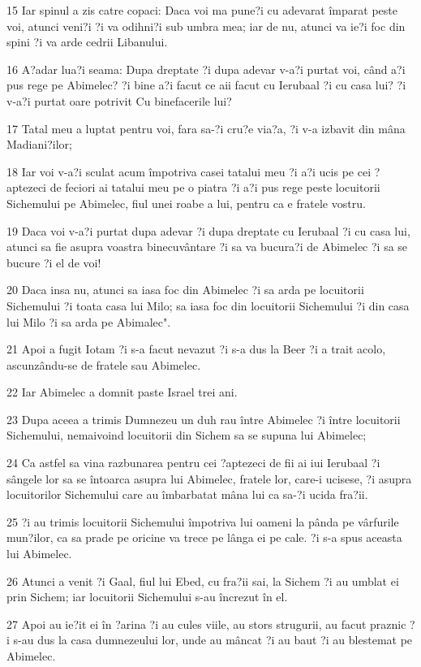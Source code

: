 \par 15 Iar spinul a zis catre copaci: Daca voi ma pune?i cu adevarat împarat peste voi, atunci veni?i ?i va odihni?i sub umbra mea; iar de nu, atunci va ie?i foc din spini ?i va arde cedrii Libanului.
\par 16 A?adar lua?i seama: Dupa dreptate ?i dupa adevar v-a?i purtat voi, când a?i pus rege pe Abimelec? ?i bine a?i facut ce aii facut cu Ierubaal ?i cu casa lui? ?i v-a?i purtat oare potrivit Cu binefacerile lui?
\par 17 Tatal meu a luptat pentru voi, fara sa-?i cru?e via?a, ?i v-a izbavit din mâna Madiani?ilor;
\par 18 Iar voi v-a?i sculat acum împotriva casei tatalui meu ?i a?i ucis pe cei ?aptezeci de feciori ai tatalui meu pe o piatra ?i a?i pus rege peste locuitorii Sichemului pe Abimelec, fiul unei roabe a lui, pentru ca e fratele vostru.
\par 19 Daca voi v-a?i purtat dupa adevar ?i dupa dreptate cu Ierubaal ?i cu casa lui, atunci sa fie asupra voastra binecuvântare ?i sa va bucura?i de Abimelec ?i sa se bucure ?i el de voi!
\par 20 Daca insa nu, atunci sa iasa foc din Abimelec ?i sa arda pe locuitorii Sichemului ?i toata casa lui Milo; sa iasa foc din locuitorii Sichemului ?i din casa lui Milo ?i sa arda pe Abimalec".
\par 21 Apoi a fugit Iotam ?i s-a facut nevazut ?i s-a dus la Beer ?i a trait acolo, ascunzându-se de fratele sau Abimelec.
\par 22 Iar Abimelec a domnit paste Israel trei ani.
\par 23 Dupa aceea a trimis Dumnezeu un duh rau între Abimelec ?i între locuitorii Sichemului, nemaivoind locuitorii din Sichem sa se supuna lui Abimelec;
\par 24 Ca astfel sa vina razbunarea pentru cei ?aptezeci de fii ai iui Ierubaal ?i sângele lor sa se întoarca asupra lui Abimelec, fratele lor, care-i ucisese, ?i asupra locuitorilor Sichemului care au îmbarbatat mâna lui ca sa-?i ucida fra?ii.
\par 25 ?i au trimis locuitorii Sichemului împotriva lui oameni la pânda pe vârfurile mun?ilor, ca sa prade pe oricine va trece pe lânga ei pe cale. ?i s-a spus aceasta lui Abimelec.
\par 26 Atunci a venit ?i Gaal, fiul lui Ebed, cu fra?ii sai, la Sichem ?i au umblat ei prin Sichem; iar locuitorii Sichemului s-au încrezut în el.
\par 27 Apoi au ie?it ei în ?arina ?i au cules viile, au stors strugurii, au facut praznic ?i s-au dus la casa dumnezeului lor, unde au mâncat ?i au baut ?i au blestemat pe Abimelec.
